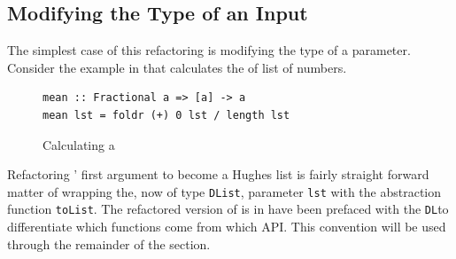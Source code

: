 \DIFdelbegin %
\DIFdelend \DIFaddbegin \subsection{Modifying the Type of an Input}
\DIFaddend 

The simplest case of this refactoring is modifying the type of a parameter. Consider the example in \DIFdelbegin {}\DIFdelend \DIFaddbegin {}\DIFaddend that calculates the \DIFdelbegin {}\DIFdelend \DIFaddbegin {}\DIFaddend of list of numbers. 

\begin{figure}[t]
\DIFdelbeginFL %
\DIFdelendFL \DIFaddbeginFL \begin{lstlisting}
mean :: Fractional a => [a] -> a
mean lst = foldr (+) 0 lst / length lst
\end{lstlisting} 
\DIFaddendFL \caption{Calculating \DIFaddbeginFL {}\DIFaddendFL a \DIFdelbeginFL {}\DIFdelendFL \DIFaddbeginFL {}\DIFaddendFL }
\DIFdelbeginFL %
\DIFdelendFL \DIFaddbeginFL \label{mean}
\DIFaddendFL \end{figure}

Refactoring \texttt{\DIFdelbegin {}\DIFdelend \DIFaddbegin {}\DIFaddend }' \DIFdelbegin {}\DIFdelend first argument to become a Hughes list is fairly straight forward matter of wrapping the, now of type \texttt{DList}, parameter \texttt{lst} with the abstraction function \texttt{toList}. The refactored version of \texttt{\DIFdelbegin {}\DIFdelend \DIFaddbegin {}\DIFaddend } is in \DIFdelbegin {}\texttt{} %
\DIFdelend \DIFaddbegin {}\texttt{} \DIFaddend have been prefaced with the \DIFaddbegin {}\DIFaddend \texttt{DL}\DIFdelbegin {}\DIFdelend \DIFaddbegin {}\DIFaddend to differentiate which functions come from which API. This convention will be used through the remainder of the section. \DIFaddbegin {}\texttt{} \texttt{} \texttt{} \DIFaddend 

